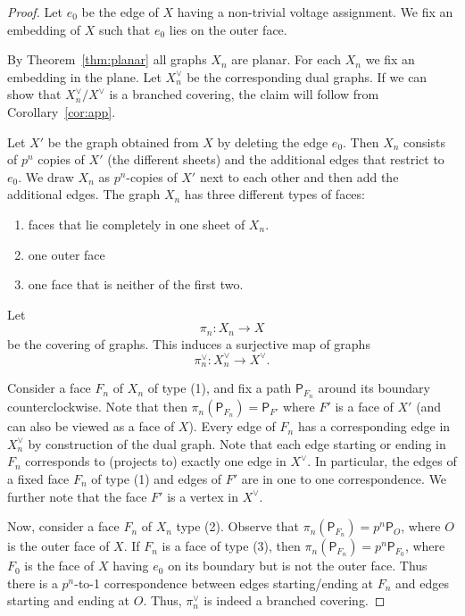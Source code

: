 \documentclass[10pt,a4paper]{amsart}
\begin{document}
\begin{proof}
{Let $e_0$ be the edge of $X$ having a non-trivial voltage assignment.
We fix an embedding of $X$ such that $e_0$ lies on the outer face.}

{By Theorem~\ref{thm:planar} all graphs $X_n$ are planar.
For each $X_n$ we fix an embedding in the plane.
Let $X_n^\vee $ be the corresponding dual graphs.
If we can show that $X_n^\vee/X^\vee $ is a branched covering, the claim will follow from Corollary~\ref{cor:app}. }

{Let $X'$ be the graph obtained from $X$ by deleting the edge $e_0$.
Then $X_n$ consists of $p^n$ copies of $X'$ (the different sheets) and the additional edges that restrict to $e_0$.
We draw $X_n$ as $p^n$-copies of $X'$ next to each other and then add the additional edges.
The graph $X_n$ has three different types of faces: 
\begin{enumerate}
    \item faces that lie completely in one sheet of $X_n$.
    \item one outer face
    \item one face that is neither of the first two.
\end{enumerate}
Let
\[
\pi_n\colon X_n \longrightarrow X
\]
be the covering of graphs.
This induces a surjective map of graphs
\[
\pi^\vee_n\colon X_n^\vee \longrightarrow X^\vee.
\]}
{Consider a face $F_{{n}}$ of $X_n$ of type (1), and fix a path $\mathsf{P}_{F_n}$ around its boundary counterclockwise.
Note that then $\pi_n(\mathsf{P}_{F_{{n}}})=\mathsf{P}_{F'}$ where $F'$ is a face of $X'$ (and can also be viewed as a face of $X$).
Every edge of $F_n$ has a corresponding edge in $X_n^\vee$ by construction of the dual graph.
Note that each edge starting or ending in $F_{{n}}$ corresponds to (projects to) exactly one edge in $X^\vee$.
In particular, the edges of a fixed face $F_{n}$ of type (1) and edges of $F'$ are in one to one correspondence.
We further note that the face $F'$ is a vertex in $X^\vee$.}

{Now, consider a face $F_{n}$ of $X_n$ type (2).
Observe that $\pi_n(\mathsf{P}_{F_{n}})=p^n \mathsf{P}_O$, where $O$ is the outer face of $X$.
If $F_n$ is a face of type (3), then $\pi_n(\mathsf{P}_{F_n})=p^n \mathsf{P}_{F_0}$, where $F_0$ is the face of $X$ having $e_0$ on its boundary but is not the outer face. 
Thus there is a $p^n$-to-1 correspondence between edges starting/ending at $F_{n}$ and edges starting and ending at $O$.
Thus, $\pi^\vee_n$ is indeed a branched covering.}
\end{proof}
\end{document}
